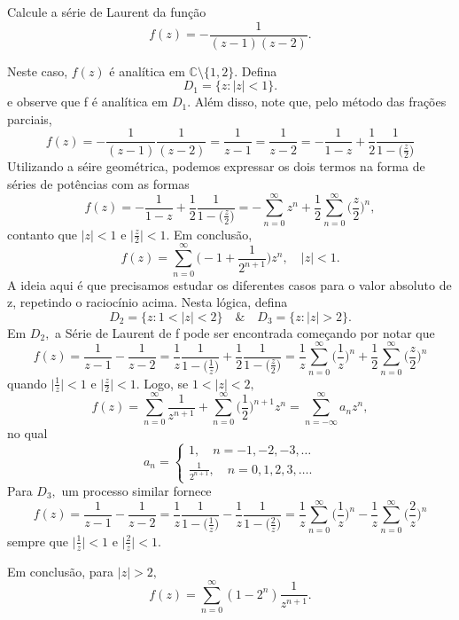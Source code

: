 \documentclass[complex.tex]{subfiles}
\begin{document}
\begin{example}
	Calcule a série de Laurent da função
	\[
		f(z) = -\frac{1}{(z-1)(z-2)}.
	\]

	Neste caso, \(f(z)\) é analítica em \(\mathbb{C}\setminus{\{1, 2\}}.\) Defina
	\[
		D_{1} = \{z:|z| < 1\}.
	\]
	e observe que f é analítica em \(D_{1}.\) Além disso, note que, pelo método das frações parciais,
	\[
		f(z) = -\frac{1}{(z-1)}\frac{1}{(z-2)} = \frac{1}{z-1} = \frac{1}{z-2} = -\frac{1}{1-z} + \frac{1}{2}\frac{1}{1-\bigl(\frac{z}{2}\bigr)}
	\]
	Utilizando a séire geométrica, podemos expressar os dois termos na forma de séries de potências com as formas
	\[
		f(z) = -\frac{1}{1-z} + \frac{1}{2}\frac{1}{1-\bigl(\frac{z}{2}\bigr)} = -\sum\limits_{n=0}^{\infty}z^{n} + \frac{1}{2}\sum\limits_{n=0}^{\infty}\biggl(\frac{z}{2}\biggr)^{n},
	\]
	contanto que \(|z| < 1\) e \(\biggl\vert \frac{z}{2}\biggr\vert < 1.\) Em conclusão,
	\[
		f(z) = \sum\limits_{n=0}^{\infty}\biggl(-1 + \frac{1}{2^{n+1}}\biggr)z^{n},\quad |z|<1.
	\]
	A ideia aqui é que precisamos estudar os diferentes casos para o valor absoluto de z, repetindo o raciocínio acima. Nesta lógica, defina
	\[
		D_{2} = \{z: 1 < |z| < 2\}\quad\&\quad D_{3} = \{z: |z| > 2\}.
	\]
	Em \(D_{2},\) a Série de Laurent de f pode ser encontrada começando por notar que
	\[
		f(z) = \frac{1}{z-1} - \frac{1}{z-2} = \frac{1}{z}\frac{1}{1-\bigl(\frac{1}{z}\bigr)} + \frac{1}{2}\frac{1}{1-\bigl(\frac{z}{2}\bigr)} = \frac{1}{z}\sum\limits_{n=0}^{\infty}\biggl(\frac{1}{z}\biggr)^{n} + \frac{1}{2}\sum\limits_{n=0}^{\infty}\biggl(\frac{z}{2}\biggr)^{n}
	\]
	quando \(\biggl\vert\frac{1}{z}\biggr\vert < 1\) e \(\biggl\vert \frac{z}{2}\biggr\vert < 1.\) Logo, se \(1 < |z| < 2,\)
	\[
		f(z) = \sum\limits_{n=0}^{\infty}\frac{1}{z^{n+1}} + \sum\limits_{n=0}^{\infty}\biggl(\frac{1}{2}\biggr)^{n+1}z^{n} = \sum\limits_{n=-\infty}^{\infty}a_{n}z^{n},
	\]
	no qual
	\[
		a_{n} = \left\{\begin{array}{ll}
			1,\quad n = -1, -2, -3, \dotsc \\
			\frac{1}{2^{n+1}},\quad n=0, 1, 2, 3,\dotsc .
		\end{array}\right.
	\]
	Para \(D_{3},\) um processo similar fornece
	\[
		f(z) = \frac{1}{z-1} - \frac{1}{z-2} = \frac{1}{z}\frac{1}{1-\bigl(\frac{1}{z}\bigr)} - \frac{1}{z}\frac{1}{1-\bigl(\frac{2}{z}\bigr)} = \frac{1}{z}\sum\limits_{n=0}^{\infty}\biggl(\frac{1}{z}\biggr)^{n} - \frac{1}{z}\sum\limits_{n=0}^{\infty}\biggl(\frac{2}{z}\biggr)^{n}
	\]
	sempre que \(\biggl\vert\frac{1}{z}\biggr\vert < 1\) e \(\biggl\vert \frac{2}{z}\biggr\vert < 1.\)

	Em conclusão, para \(|z| > 2,\)
	\[
		f(z) = \sum\limits_{n=0}^{\infty}(1-2^{n})\frac{1}{z^{n+1}}.
	\]
\end{example}
\end{document}
